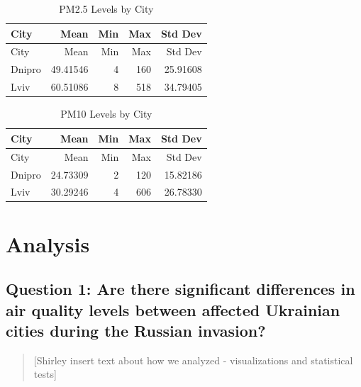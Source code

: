 \documentclass[
  12pt,
]{article}
\begin{document}
\begin{longtable}[]{@{}lrrrr@{}}
\caption{PM2.5 Levels by City}\tabularnewline
\toprule
City & Mean & Min & Max & Std Dev \\
\midrule
\endfirsthead
\toprule
City & Mean & Min & Max & Std Dev \\
\midrule
\endhead
Dnipro & 49.41546 & 4 & 160 & 25.91608 \\
Lviv & 60.51086 & 8 & 518 & 34.79405 \\
\bottomrule
\end{longtable}

\begin{longtable}[]{@{}lrrrr@{}}
\caption{PM10 Levels by City}\tabularnewline
\toprule
City & Mean & Min & Max & Std Dev \\
\midrule
\endfirsthead
\toprule
City & Mean & Min & Max & Std Dev \\
\midrule
\endhead
Dnipro & 24.73309 & 2 & 120 & 15.82186 \\
Lviv & 30.29246 & 4 & 606 & 26.78330 \\
\bottomrule
\end{longtable}

\newpage

\hypertarget{analysis}{%
\section{Analysis}\label{analysis}}

\hypertarget{question-1-are-there-significant-differences-in-air-quality-levels-between-affected-ukrainian-cities-during-the-russian-invasion}{%
\subsection{Question 1: Are there significant differences in air quality
levels between affected Ukrainian cities during the Russian
invasion?}\label{question-1-are-there-significant-differences-in-air-quality-levels-between-affected-ukrainian-cities-during-the-russian-invasion}}

\begin{quote}
{[}Shirley insert text about how we analyzed - visualizations and
statistical tests{]}
\end{quote}
\end{document}

